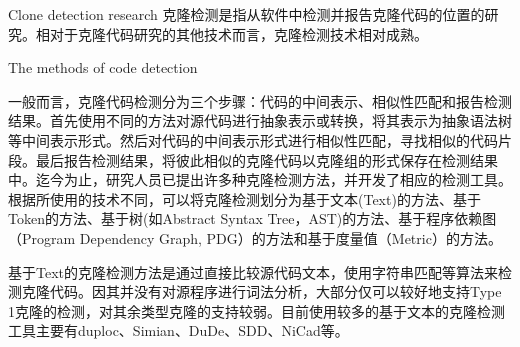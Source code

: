 
{Clone detection research}
克隆检测是指从软件中检测并报告克隆代码的位置的研究。相对于克隆代码研究的其他技术而言，克隆检测技术相对成熟。

{The methods of code detection}

一般而言，克隆代码检测分为三个步骤：代码的中间表示、相似性匹配和报告检测结果。首先使用不同的方法对源代码进行抽象表示或转换，将其表示为抽象语法树等中间表示形式。然后对代码的中间表示形式进行相似性匹配，寻找相似的代码片段。最后报告检测结果，将彼此相似的克隆代码以克隆组的形式保存在检测结果中。迄今为止，研究人员已提出许多种克隆检测方法，并开发了相应的检测工具。根据所使用的技术不同，可以将克隆检测划分为基于文本(Text)的方法、基于Token的方法、基于树(如Abstract Syntax Tree，AST)的方法、基于程序依赖图（Program Dependency Graph, PDG）的方法和基于度量值（Metric）的方法。

基于Text的克隆检测方法是通过直接比较源代码文本，使用字符串匹配等算法来检测克隆代码。因其并没有对源程序进行词法分析，大部分仅可以较好地支持Type 1克隆的检测，对其余类型克隆的支持较弱。目前使用较多的基于文本的克隆检测工具主要有duploc\cite{ducasse1999language}、Simian\cite{Simian}、DuDe\cite{wettel2005archeology}、SDD\cite{lee2005sdd}、NiCad\cite{roy2008nicad}等。

